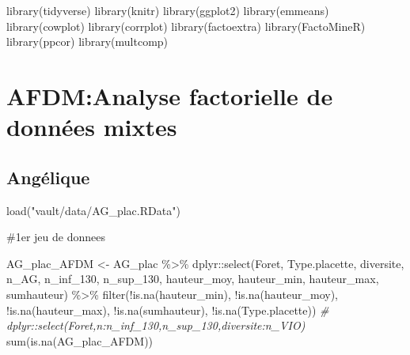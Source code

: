 \documentclass[
  12pt,
  american,
  a4paper,
  extrafontsizes,onecolumn,openright
  ]{memoir}
\newenvironment{Shaded}{\begin{snugshade}}{\end{snugshade}}
\newcommand{\CommentTok}[1]{\textcolor[rgb]{0.56,0.35,0.01}{\textit{#1}}}
\newcommand{\FunctionTok}[1]{\textcolor[rgb]{0.00,0.00,0.00}{#1}}
\newcommand{\NormalTok}[1]{#1}
\newcommand{\OtherTok}[1]{\textcolor[rgb]{0.56,0.35,0.01}{#1}}
\newcommand{\SpecialCharTok}[1]{\textcolor[rgb]{0.00,0.00,0.00}{#1}}
\newcommand{\StringTok}[1]{\textcolor[rgb]{0.31,0.60,0.02}{#1}}
\begin{document}
\normalsize

\scriptsize

\begin{Shaded}
\begin{Highlighting}[]
\FunctionTok{library}\NormalTok{(tidyverse)}
\FunctionTok{library}\NormalTok{(knitr)}
\FunctionTok{library}\NormalTok{(ggplot2)}
\FunctionTok{library}\NormalTok{(emmeans)}
\FunctionTok{library}\NormalTok{(cowplot)}
\FunctionTok{library}\NormalTok{(corrplot)}
\FunctionTok{library}\NormalTok{(factoextra)}
\FunctionTok{library}\NormalTok{(FactoMineR)}
\FunctionTok{library}\NormalTok{(ppcor)}
\FunctionTok{library}\NormalTok{(multcomp)}
\end{Highlighting}
\end{Shaded}

\normalsize

\hypertarget{afdmanalyse-factorielle-de-donnuxe9es-mixtes}{%
\chapter{AFDM:Analyse factorielle de données mixtes}\label{afdmanalyse-factorielle-de-donnuxe9es-mixtes}}

\hypertarget{anguxe9lique}{%
\section{Angélique}\label{anguxe9lique}}

\scriptsize

\begin{Shaded}
\begin{Highlighting}[]
\FunctionTok{load}\NormalTok{(}\StringTok{"vault/data/AG\_plac.RData"}\NormalTok{)}
\end{Highlighting}
\end{Shaded}

\normalsize

\#1er jeu de donnees

\scriptsize

\begin{Shaded}
\begin{Highlighting}[]
\NormalTok{AG\_plac\_AFDM }\OtherTok{\textless{}{-}}\NormalTok{ AG\_plac }\SpecialCharTok{\%\textgreater{}\%}
\NormalTok{    dplyr}\SpecialCharTok{::}\FunctionTok{select}\NormalTok{(Foret, Type.placette, diversite, n\_AG, n\_inf\_130,}
\NormalTok{        n\_sup\_130, hauteur\_moy, hauteur\_min, hauteur\_max, sumhauteur) }\SpecialCharTok{\%\textgreater{}\%}
    \FunctionTok{filter}\NormalTok{(}\SpecialCharTok{!}\FunctionTok{is.na}\NormalTok{(hauteur\_min), }\SpecialCharTok{!}\FunctionTok{is.na}\NormalTok{(hauteur\_moy), }\SpecialCharTok{!}\FunctionTok{is.na}\NormalTok{(hauteur\_max),}
        \SpecialCharTok{!}\FunctionTok{is.na}\NormalTok{(sumhauteur), }\SpecialCharTok{!}\FunctionTok{is.na}\NormalTok{(Type.placette))}
\CommentTok{\# dplyr::select(Foret,n:n\_inf\_130,n\_sup\_130,diversite:n\_VIO)}
\FunctionTok{sum}\NormalTok{(}\FunctionTok{is.na}\NormalTok{(AG\_plac\_AFDM))}
\end{Highlighting}
\end{Shaded}
\end{document}
